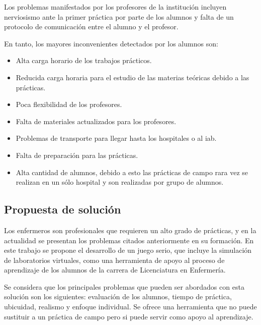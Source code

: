 Los problemas manifestados por los profesores de la institución incluyen
nerviosismo ante la primer práctica por parte de los alumnos y falta de un
protocolo de comunicación entre el alumno y el profesor.

En tanto, los mayores inconvenientes detectados por los alumnos son:
\begin{itemize}
\item Alta carga horario de los trabajos prácticos.
\item Reducida carga horaria para el estudio de las materias teóricas 
debido a las prácticas.
\item Poca flexibilidad de los profesores.
\item Falta de materiales actualizados para los profesores.
\item Problemas de transporte para llegar hasta los hospitales o al 
    \gls{iab}.
\item Falta de preparación para las prácticas.
\item Alta cantidad de alumnos, debido a esto las prácticas de campo 
rara vez se realizan en un sólo hospital y son realizadas por grupo de
alumnos.
\end{itemize}

\subsection{Propuesta de solución}

Los enfermeros son profesionales que requieren un alto grado de prácticas, y
en la actualidad se presentan los problemas citados anteriormente en su formación. En este
trabajo se propone el desarrollo de un juego serio, que incluye la simulación
de laboratorios virtuales, como una herramienta de apoyo al proceso de aprendizaje
de los alumnos de la carrera de Licenciatura en Enfermería.

Se considera que los principales problemas que pueden ser abordados con esta
solución son los siguientes: evaluación de los alumnos, tiempo de práctica,
ubicuidad, realismo y enfoque individual. Se ofrece una herramienta que no puede
sustituir a un práctica de campo pero si puede servir como apoyo al aprendizaje.

